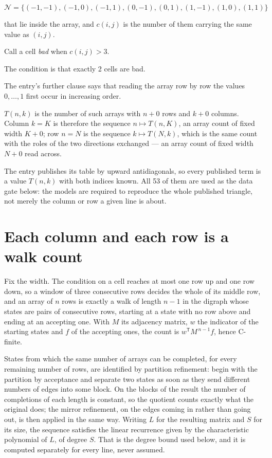 \documentclass[11pt]{article}
\theoremstyle{definition}
\begin{document}
\[\mathcal{N} = \{(-1,-1), (-1,0), (-1,1), (0,-1), (0,1), (1,-1), (1,0), (1,1)\}\]

that lie inside the array, and $c(i,j)$ is the number of them carrying the same value as $(i,j)$.

Call a cell {\itshape bad} when $c(i,j) > 3$.

The condition is that exactly 2 cells are bad.

The entry's further clause says that reading the array row by row the values $0,\dots,1$ first occur in increasing order.

$T(n,k)$ is the number of such arrays with $n + 0$ rows and $k + 0$ columns. Column $k = K$ is therefore the sequence $n \mapsto T(n,K)$, an array count of fixed width $K + 0$; row $n = N$ is the sequence $k \mapsto T(N,k)$, which is the same count with the roles of the two directions exchanged --- an array count of fixed width $N + 0$ read across.

The entry publishes its table by upward antidiagonals, so every published term is a value $T(n,k)$ with both indices known. All 53 of them are used as the data gate below: the models are required to reproduce the whole published triangle, not merely the column or row a given line is about.

\section{Each column and each row is a walk count}

Fix the width. The condition on a cell reaches at most one row up and one row down, so a window of three consecutive rows decides the whole of its middle row, and an array of $n$ rows is exactly a walk of length $n-1$ in the digraph whose states are pairs of consecutive rows, starting at a state with no row above and ending at an accepting one. With $M$ its adjacency matrix, $w$ the indicator of the starting states and $f$ of the accepting ones, the count is $w^{\mathsf T}M^{\,n-1}f$, hence C-finite.

States from which the same number of arrays can be completed, for every remaining number of rows, are identified by partition refinement: begin with the partition by acceptance and separate two states as soon as they send different numbers of edges into some block. On the blocks of the result the number of completions of each length is constant, so the quotient counts exactly what the original does; the mirror refinement, on the edges coming in rather than going out, is then applied in the same way. Writing $L$ for the resulting matrix and $S$ for its size, the sequence satisfies the linear recurrence given by the characteristic polynomial of $L$, of degree $S$. That is the degree bound used below, and it is computed separately for every line, never assumed.
\end{document}
